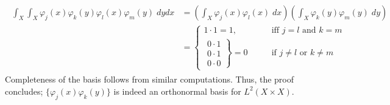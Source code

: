 \documentclass{article}
\begin{document}
	\begin{align*}
		\begin{split}
			\int_{X}\int_{X}\varphi_{j}(x)\varphi_{k}(y)\varphi_{l}(x)\varphi_{m}(y)\;dy dx &= \left(\int_{X}\varphi_{j}(x)\varphi_{l}(x)\;dx\right)\left(\int_{X}\varphi_{k}(y)\varphi_{m}(y)\;dy\right) \\
			&=  
			\begin{cases}
				1 \cdot 1 = 1, & \qquad \text{iff $j = l$ and $k = m$} \\
				\left.
				\substack{\displaystyle 0 \cdot 1 \\ \displaystyle 0 \cdot 1 \\ \displaystyle 0 \cdot 0}\right\} = 0 & \qquad \text{if $j \neq l$ or $k \neq m$}
			\end{cases}
		\end{split}
	\end{align*}
	Completeness of the basis follows from similar computations. Thus, the proof concludes; $\{\varphi_j(x)\varphi_{k}(y)\}$ is indeed an orthonormal basis for $L^{2}(X \times X)$. 
	
\end{document}
